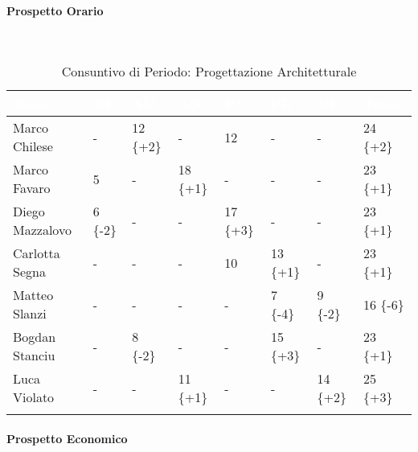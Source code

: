 \paragraph{Prospetto Orario} ~\\

\begin{longtable}{|C{.30\textwidth}|C{.06\textwidth}|C{.06\textwidth}|C{.06\textwidth} | C{.06\textwidth}| C{.06\textwidth} | C{.06\textwidth} | C{.10\textwidth} |}
\hline
{}	\textbf{\textcolor{white}{Nome}} & \textbf{\textcolor{white}{RE}} & \textbf{\textcolor{white}{AM}} & \textbf{\textcolor{white}{AN}} & \textbf{\textcolor{white}{PJ}} & \textbf{\textcolor{white}{PR}} & \textbf{\textcolor{white}{VE}} & \textbf{\textcolor{white}{Totale}}\\
\hline 
Marco Chilese & - & 12 \{+2\} & - & 12 & - & - & 24 \{+2\} \\
\hline
{}Marco Favaro & 5 & - & 18 \{+1\}  & - & - & - & 23 \{+1\} \\
\hline
Diego Mazzalovo & 6 \{-2\}& - & - & 17 \{+3\} & - & - & 23 \{+1\} \\ 
\hline
{}Carlotta Segna & - & - & - & 10 & 13 \{+1\} & - & 23 \{+1\} \\
\hline
Matteo Slanzi & - & - & - & - & 7 \{-4\} & 9 \{-2\} & 16 \{-6\} \\
\hline
{}Bogdan Stanciu & - & 8 \{-2\}& - & - & 15 \{+3\} & - & 23 \{+1\} \\
\hline
Luca Violato & - & - & 11 \{+1\} & - & - & 14 \{+2\} & 25 \{+3\} \\
\hline 

\caption{Consuntivo di Periodo: Progettazione Architetturale}
\label{Distribuzione oraria del periodo di pa}
\end{longtable}


\paragraph{Prospetto Economico} ~\\

